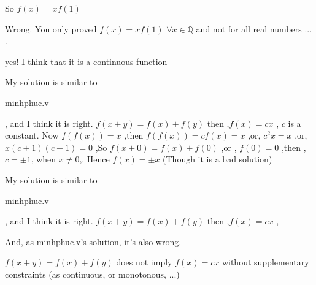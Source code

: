 \begin{solution}
	\begin{tcolorbox}So $f(x)=xf(1)$ \end{tcolorbox}
Wrong. You only proved $f(x)=xf(1)$ $\forall x\in\mathbb Q$ and not for all real numbers ... .
\end{solution}



\begin{solution}
	yes!  I think that it is a continuous function
\end{solution}



\begin{solution}
	My solution is similar to \begin{bolded}minhphuc.v\end{bolded}, and I think it is right.
$f(x+y)=f(x)+f(y)$ then ,$f(x)=cx$ , $c$ is a constant. Now $f(f(x))=x$ ,then $f(f(x))=cf(x)=x$ ,or, $c^2x=x$ ,or, $x(c+1)(c-1)=0$ ,So $f(x+0)=f(x)+f(0)$ ,or , $f(0)=0$ ,then ,$c=\pm{1}$, when $x\neq{0}$,.
Hence $f(x)=\pm{x}$ 
                                                                                                                                                                                        (Though it is a bad solution)
\end{solution}



\begin{solution}
	\begin{tcolorbox}My solution is similar to \begin{bolded}minhphuc.v\end{bolded}, and I think it is right.
$f(x+y)=f(x)+f(y)$ then ,$f(x)=cx$ , \end{tcolorbox}
And, as minhphuc.v's solution, it's also wrong.

$f(x+y)=f(x)+f(y)$ does not imply $f(x)=cx$ without supplementary constraints (as continuous, or monotonous, ...)
\end{solution}



